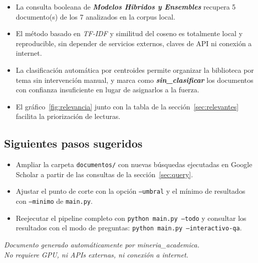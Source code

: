 \documentclass[11pt,a4paper]{article}
\newcommand{\tema}[1]{\textbf{\textit{#1}}}
\begin{document}
\begin{itemize}
\setlength{\itemsep}{4pt}
  \item La consulta booleana de \tema{ Modelos Hibridos y Ensembles } recupera
        5 documento(s) de los 7
        analizados en la corpus local.
  \item El método basado en \textit{TF-IDF} y similitud del coseno es
        totalmente local y reproducible, sin depender de servicios externos,
        claves de API ni conexión a internet.
  \item La clasificación automática por centroides permite organizar la
        biblioteca por tema sin intervención manual, y marca como
        \tema{sin\_clasificar} los documentos con confianza insuficiente en
        lugar de asignarlos a la fuerza.
  \item El gráfico~\ref{fig:relevancia} junto con la tabla de la
        sección~\ref{sec:relevantes} facilita la priorización de lecturas.
\end{itemize}

\subsection*{Siguientes pasos sugeridos}

\begin{itemize}
\setlength{\itemsep}{3pt}
  \item Ampliar la carpeta \texttt{documentos/} con nuevas búsquedas
        ejecutadas en Google Scholar a partir de las consultas de la
        sección~\ref{sec:query}.
  \item Ajustar el punto de corte con la opción \texttt{--umbral} y el mínimo
        de resultados con \texttt{--minimo} de \texttt{main.py}.
  \item Reejecutar el pipeline completo con \texttt{python main.py --todo}
        y consultar los resultados con el modo de preguntas:
        \texttt{python main.py --interactivo-qa}.
\end{itemize}

\vfill
\begin{center}
\small
\textit{Documento generado automáticamente por mineria\_academica.\\
No requiere GPU, ni APIs externas, ni conexión a internet.}
\end{center}
\end{document}
